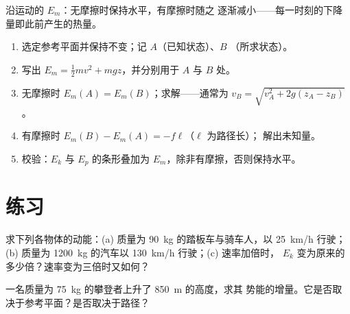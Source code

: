 \begin{omfigure}

{\small 沿运动的 $E_m$：无摩擦时保持水平，有摩擦时随之
逐渐减小——每一时刻的下降量即此前产生的热量。}
\end{omfigure}

\begin{method}[能量核算]\label{met:g11:mechanical-energy:bookkeeping}
\begin{enumerate}
  \item 选定参考平面并保持不变；记 $A$（已知状态）、$B$
        （所求状态）。
  \item 写出 $E_m = \tfrac12 mv^2 + mgz$，并分别用于 $A$ 与 $B$ 处。
  \item 无摩擦时 $E_m(A) = E_m(B)$；求解——通常为
        $v_B = \sqrt{v_A^2 + 2g(z_A - z_B)}$。
  \item 有摩擦时 $E_m(B) - E_m(A) = -f\ell$（$\ell$ 为路径长）；
        解出未知量。
  \item 校验：$E_k$ 与 $E_p$ 的条形叠加为 $E_m$，除非有摩擦，否则保持水平。
\end{enumerate}
\end{method}

\section{练习}

\begin{exercise}[$\star$]\label{exo:g11:mechanical-energy:1}
求下列各物体的动能：(a) 质量为 \qty{90}{kg} 的踏板车与骑车人，以
\qty{25}{km/h} 行驶；(b) 质量为 \qty{1200}{kg} 的汽车以 \qty{130}{km/h} 行驶；(c) 速率加倍时，
$E_k$ 变为原来的多少倍？速率变为三倍时又如何？
\end{exercise}

\begin{exercise}[$\star$]\label{exo:g11:mechanical-energy:2}
一名质量为 \qty{75}{kg} 的攀登者上升了 \qty{850}{m} 的高度，求其
势能的增量。它是否取决于参考平面？是否取决于路径？
\end{exercise}

